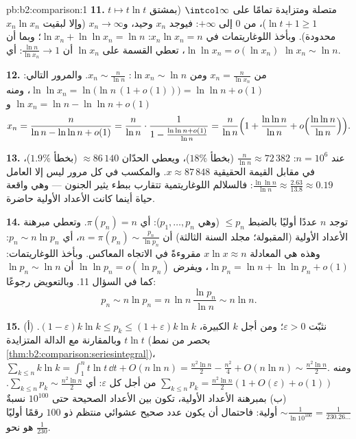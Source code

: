 \begin{solution}{pb:b2:comparison:1}
\textbf{11.} $t \mapsto t\ln t$ متصلة ومتزايدة تمامًا
على $\intco1\infty$ (بمشتق $\ln t + 1 \geq 1$)،
من $0$ إلى $+\infty$: فيوجد $x_n$ وحيد، و$x_n \to
\infty$ (وإلا لبقيت $x_n\ln x_n$ محدودة). وبأخذ
اللوغاريتمات في $x_n\ln x_n = n$: $\ln x_n + \ln\ln x_n = \ln n$؛
وبما أن $\ln\ln x_n = o(\ln x_n)$، تعطي القسمة على $\ln x_n$
أن $\frac{\ln n}{\ln x_n} \to 1$: أي $\ln x_n \sim \ln n$.

\textbf{12.} من $x_n = \frac{n}{\ln x_n}$ ومن $\ln x_n \sim
\ln n$: $x_n \sim \frac{n}{\ln n}$. والمرور التالي: $\ln\ln x_n =
\ln\bigl(\ln n\,(1 + o(1))\bigr) = \ln\ln n + o(1)$، ومنه $\ln
x_n = \ln n - \ln\ln n + o(1)$ و
\[
x_n = \frac{n}{\ln n - \ln\ln n + o(1)}
= \frac{n}{\ln n}\cdot\frac{1}{1 - \frac{\ln\ln n +
o(1)}{\ln n}}
= \frac{n}{\ln n}\Bigl(1 + \frac{\ln\ln n}{\ln n} +
o\Bigl(\frac{\ln\ln n}{\ln n}\Bigr)\Bigr).
\]

\textbf{13.} عند $n = 10^6$: $\frac{n}{\ln n} \approx 72\,382$
(بخطأ $18\%$)، ويعطي الحدّان $\approx 86\,140$ (بخطأ
$1.9\%$)، في مقابل القيمة الحقيقية $x \approx 87\,848$. والمكسب في كل
مرور ليس إلا العامل $\frac{\ln\ln n}{\ln n} \approx
\frac{2.63}{13.8} \approx 0.19$: فالسلالم اللوغاريتمية تتقارب
ببطء يثير الجنون --- وهي واقعة حياة أينما كانت الأعداد الأولية
حاضرة.

\textbf{14.} توجد $n$ عددًا أوليًا بالضبط $\leq p_n$ (وهي
$p_1, \dots, p_n$): أي $\pi(p_n) = n$. وتعطي مبرهنة الأعداد الأولية
(المقبولة؛ مجلد السنة الثالثة) أن $n = \pi(p_n) \sim
\frac{p_n}{\ln p_n}$، أي $p_n \sim n\ln p_n$: وهذه هي
المعادلة $x\ln x \approx n$ مقروءةً في الاتجاه المعاكس. وبأخذ اللوغاريتمات:
$\ln p_n = \ln n + \ln\ln p_n + o(1)$، ويفرض $\ln\ln p_n =
o(\ln p_n)$ أن $\ln p_n \sim \ln n$ كما في السؤال 11.
وبالتعويض رجوعًا:
\[
p_n \sim n\ln p_n = n\,\ln n\,\frac{\ln p_n}{\ln n} \sim n\ln
n .
\]

\textbf{15.} (أ) نثبّت $\varepsilon > 0$؛ ومن أجل $k$ الكبيرة، $(1 -
\varepsilon)k\ln k \leq p_k \leq (1 + \varepsilon)k\ln k$. وبالمقارنة مع الدالة المتزايدة $t\ln t$
(بحصر من نمط \cref{thm:b2:comparison:seriesintegral})،
$\sum_{k\leq n}k\ln k = \int_1^n t\ln t\,\dd t + O(n\ln n) =
\frac{n^2\ln n}2 - \frac{n^2}4 + O(n\ln n) \sim
\frac{n^2\ln n}2$. ومنه $\sum_{k\leq n}p_k = \frac{n^2\ln
n}{2}(1 + O(\varepsilon) + o(1))$ من أجل كل $\varepsilon$:
أي $\sum_{k\leq n}p_k \sim \frac{n^2\ln n}2$. (ب) بمبرهنة الأعداد
الأولية، تكون بين الأعداد الصحيحة حتى $10^{100}$ نسبةٌ
$\sim \frac{1}{\ln 10^{100}} = \frac1{230.26\dots}$
أولية: فاحتمال أن يكون عدد صحيح عشوائي منتظم ذو $100$ رقمًا أوليًا
هو نحو $\frac1{230}$.


\end{solution}
